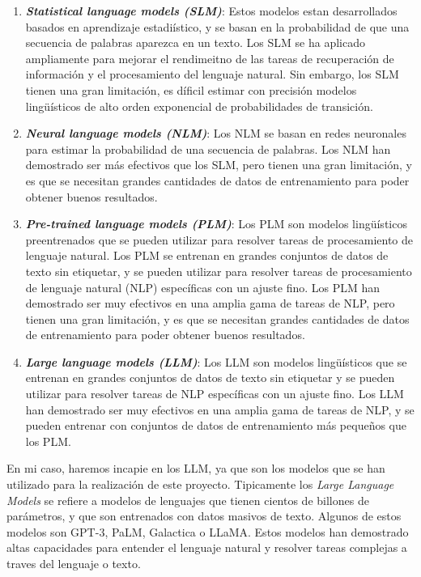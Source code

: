 \begin{enumerate}
    \item \textit{\textbf{Statistical language models (SLM)}}: Estos modelos estan desarrollados basados en aprendizaje
        estadiístico, y se basan en la probabilidad de que una secuencia de palabras aparezca en un texto. Los 
        SLM se ha aplicado ampliamente para mejorar el rendimeitno de las tareas de recuperación de información
        y el procesamiento del lenguaje natural. Sin embargo, los SLM tienen una gran limitación, es díficil
        estimar con precisión modelos lingüísticos de alto orden exponencial de probabilidades de transición.
    \item \textit{\textbf{Neural language models (NLM)}}: Los NLM se basan en redes neuronales para estimar la probabilidad
        de una secuencia de palabras. Los NLM han demostrado ser más efectivos que los SLM, pero tienen una gran
        limitación, y es que se necesitan grandes cantidades de datos de entrenamiento para poder obtener buenos
        resultados.
    \item \textit{\textbf{Pre-trained language models (PLM)}}: Los PLM son modelos lingüísticos preentrenados que se pueden
        utilizar para resolver tareas de procesamiento de lenguaje natural. Los PLM se entrenan en grandes conjuntos
        de datos de texto sin etiquetar, y se pueden utilizar para resolver tareas de procesamiento de lenguaje
        natural (NLP) específicas con un ajuste fino. Los PLM han demostrado ser muy efectivos en una amplia gama
        de tareas de NLP, pero tienen una gran limitación, y es que se necesitan grandes cantidades de datos de
        entrenamiento para poder obtener buenos resultados.
    \item \textit{\textbf{Large language models (LLM)}}: Los LLM son modelos lingüísticos que se entrenan en grandes conjuntos
        de datos de texto sin etiquetar y se pueden utilizar para resolver tareas de NLP específicas con un ajuste
        fino. Los LLM han demostrado ser muy efectivos en una amplia gama de tareas de NLP, y se pueden entrenar
        con conjuntos de datos de entrenamiento más pequeños que los PLM.
\end{enumerate}

En mi caso, haremos incapie en los LLM, ya que son los modelos que se han utilizado para la realización de este
proyecto. Tipicamente los \textit{Large Language Models} se refiere a modelos de lenguajes que 
tienen cientos de billones de parámetros, y que son entrenados con datos masivos de texto.
Algunos de estos modelos son GPT-3, PaLM, Galactica o LLaMA. Estos modelos han demostrado altas
capacidades para entender el lenguaje natural y resolver tareas complejas a traves del lenguaje o texto.

